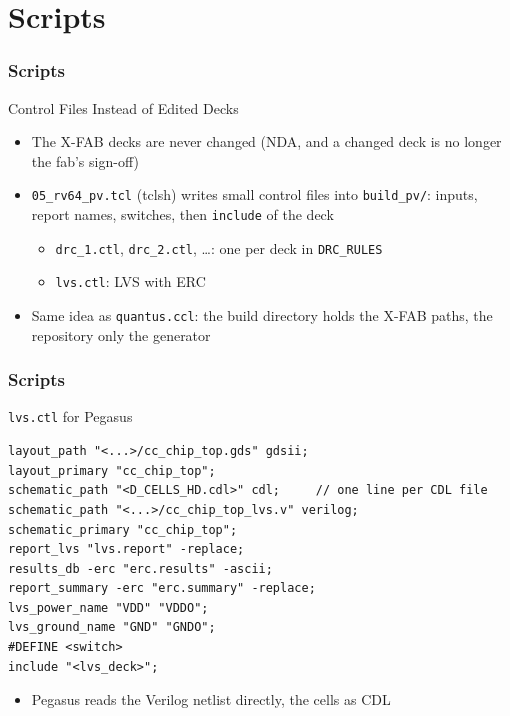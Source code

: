 \documentclass{beamer}
\newcommand{\astitle}{nix}
\newcommand{\assubtitle}{nix}
\newcommand{\cmd}[1]{\texttt{#1}}
\begin{document}
\section{Scripts}
\renewcommand{\astitle}{Scripts}

\renewcommand{\assubtitle}{Control Files Instead of Edited Decks}
\begin{frame}
\frametitle{\astitle}
\begin{block}{\assubtitle}
  \begin{itemize}
    \item The X-FAB decks are never changed (NDA, and a changed deck is no
      longer the fab's sign-off)
    \item \cmd{05\_rv64\_pv.tcl} (tclsh) writes small control files into
      \cmd{build\_pv/}: inputs, report names, switches, then
      \cmd{include} of the deck
    \begin{itemize}
      \item \cmd{drc\_1.ctl}, \cmd{drc\_2.ctl}, \dots: one per deck in
        \cmd{DRC\_RULES}
      \item \cmd{lvs.ctl}: LVS with ERC
    \end{itemize}
    \item Same idea as \cmd{quantus.ccl}: the build directory holds the
      X-FAB paths, the repository only the generator
  \end{itemize}
\end{block}
\end{frame}

\renewcommand{\assubtitle}{\texttt{lvs.ctl} for Pegasus}
\begin{frame}[fragile]
\frametitle{\astitle}
\begin{block}{\assubtitle}
\begin{lstlisting}[style=sh]
layout_path "<...>/cc_chip_top.gds" gdsii;
layout_primary "cc_chip_top";
schematic_path "<D_CELLS_HD.cdl>" cdl;     // one line per CDL file
schematic_path "<...>/cc_chip_top_lvs.v" verilog;
schematic_primary "cc_chip_top";
report_lvs "lvs.report" -replace;
results_db -erc "erc.results" -ascii;
report_summary -erc "erc.summary" -replace;
lvs_power_name "VDD" "VDDO";
lvs_ground_name "GND" "GNDO";
#DEFINE <switch>
include "<lvs_deck>";
\end{lstlisting}
  \begin{itemize}
    \item Pegasus reads the Verilog netlist directly, the cells as CDL
  \end{itemize}
\end{block}
\end{frame}
\end{document}
